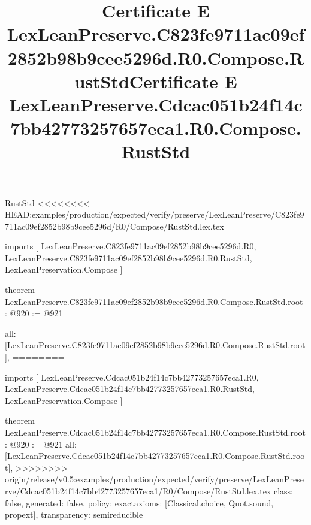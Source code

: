 \begin{lexlean}{RustStd}
<<<<<<<< HEAD:examples/production/expected/verify/preserve/LexLeanPreserve/C823fe9711ac09ef2852b98b9cee5296d/R0/Compose/RustStd.lex.tex
\title{Certificate E LexLeanPreserve.C823fe9711ac09ef2852b98b9cee5296d.R0.Compose.RustStd}
\begin{coremodule}
imports [
  LexLeanPreserve.C823fe9711ac09ef2852b98b9cee5296d.R0,
  LexLeanPreserve.C823fe9711ac09ef2852b98b9cee5296d.R0.RustStd,
  LexLeanPreservation.Compose
]

theorem LexLeanPreserve.C823fe9711ac09ef2852b98b9cee5296d.R0.Compose.RustStd.root : @920 := @921 {
  all: [LexLeanPreserve.C823fe9711ac09ef2852b98b9cee5296d.R0.Compose.RustStd.root],
========
\title{Certificate E LexLeanPreserve.Cdcac051b24f14c7bb42773257657eca1.R0.Compose.RustStd}
\begin{coremodule}
imports [
  LexLeanPreserve.Cdcac051b24f14c7bb42773257657eca1.R0,
  LexLeanPreserve.Cdcac051b24f14c7bb42773257657eca1.R0.RustStd,
  LexLeanPreservation.Compose
]

theorem LexLeanPreserve.Cdcac051b24f14c7bb42773257657eca1.R0.Compose.RustStd.root : @920 := @921 {
  all: [LexLeanPreserve.Cdcac051b24f14c7bb42773257657eca1.R0.Compose.RustStd.root],
>>>>>>>> origin/release/v0.5:examples/production/expected/verify/preserve/LexLeanPreserve/Cdcac051b24f14c7bb42773257657eca1/R0/Compose/RustStd.lex.tex
  class: false,
  generated: false,
  policy: exact{axioms: [Classical.choice, Quot.sound, propext]},
  transparency: semireducible
}


\end{coremodule}}
\end{coremodule}
\end{lexlean}
